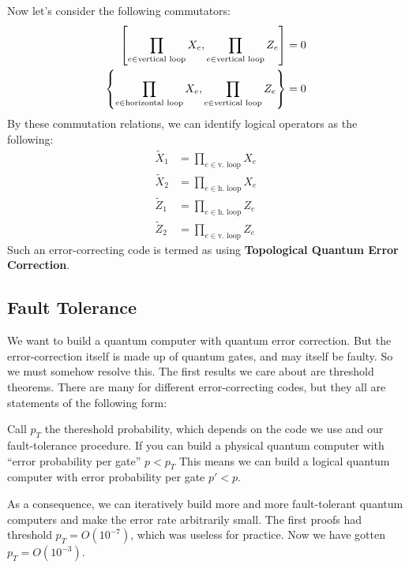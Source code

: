 Now let's consider the following commutators:
\begin{align*}
    \qty[\prod_{e \in \text{vertical loop}} X_e, \prod_{e \in \text{vertical loop}} Z_e] &= 0 \\
    \qty{\prod_{e \in \text{horizontal loop}} X_e, \prod_{e \in \text{vertical loop}} Z_e} &= 0
\end{align*}
By these commutation relations, we can identify logical operators as the following:
\begin{align*}
    \tilde{X}_1 &= \prod_{e \in \text{v. loop}} X_e \\
    \tilde{X}_2 &= \prod_{e \in \text{h. loop}} X_e \\
    \tilde{Z}_1 &= \prod_{e \in \text{h. loop}} Z_e \\
    \tilde{Z}_2 &= \prod_{e \in \text{v. loop}} Z_e
\end{align*}
Such an error-correcting code is termed as using \textbf{Topological Quantum Error Correction}.

\subsection{Fault Tolerance}
We want to build a quantum computer with quantum error correction. But the error-correction itself is made up of quantum gates, and may itself be faulty.
So we must somehow resolve this.
The first results we care about are threshold theorems. There are many for different error-correcting codes, but they all are statements of the following form:
\begin{ptheorem}
    Call $p_T$ the thereshold probability, which depends
    on the code we use and our fault-tolerance procedure. If you can build a physical quantum computer with ``error probability per gate'' $p < p_T$
    This means we can build a logical quantum computer with error probability per gate $p' < p$.
\end{ptheorem}
As a consequence, we can iteratively build more and more fault-tolerant quantum computers and make the error rate arbitrarily small. The first proofs
had threshold $p_T = O(10^{-7})$, which was useless for practice. Now we have gotten $p_T = O(10^{-3})$.

